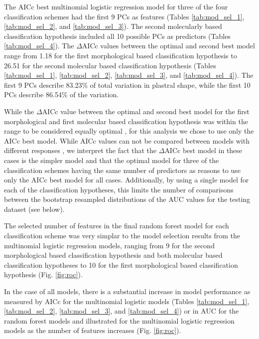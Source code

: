 \documentclass[12pt,letterpaper]{article}\usepackage{graphicx, color}
\begin{document}
The AICc best multinomial logistic regression model for three of the four classification schemes had the first 9 PCs as features (Tables \ref{tab:mod_sel_1}, \ref{tab:mod_sel_2}, and \ref{tab:mod_sel_3}). The second molecularly based classification hypothesis included all 10 possible PCs as predictors (Tables \ref{tab:mod_sel_4}).
The \(\Delta\)AICc values between the optimal and second best model range from 1.18 for the first morphological based classification hypothesis to 26.51 for the second molecular based classification hypothesis (Tables \ref{tab:mod_sel_1}, \ref{tab:mod_sel_2}, \ref{tab:mod_sel_3}, and \ref{tab:mod_sel_4}). The first 9 PCs describe 83.23\% of total variation in plastral shape, while the first 10 PCs describe 86.54\% of the variation.

While the \(\Delta\)AICc value between the optimal and second best model for the first morphological and first molecular based classification hypothesis was within the range to be considered equally optimal \citep{Burnham2002a}, for this analysis we chose to use only the AICc best model. While AICc values can not be compared between models with different responses \citep{Burnham2002a}, we interpret the fact that the \(\Delta\)AICc best model in these cases is the simpler model and that the optimal model for three of the classification schemes having the same number of predictors as reasons to use only the AICc best model for all cases. 
Additionally, by using a single model for each of the classification hypotheses, this limits the number of comparisons between the bootstrap resampled distributions of the AUC values for the testing dataset (see below).




The selected number of features in the final random forest model for each classification scheme was very simplar to the model selection results from the multinomial logistic regression models, ranging from 9 for the second morphological based classification hypothesis and both molecular based classification hypotheses to 10 for the first morphological based classification hypothesis (Fig. \ref{fig:roc}). 


In the case of all models, there is a substantial increase in model performance as measured by AICc for the multinomial logistic models (Tables \ref{tab:mod_sel_1}, \ref{tab:mod_sel_2}, \ref{tab:mod_sel_3}, and \ref{tab:mod_sel_4}) or in AUC for the random forest models and illustrated for the multinomial logistic regression models as the number of features increases (Fig. \ref{fig:roc}). 
\end{document}
